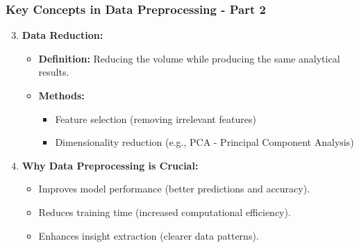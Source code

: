 \documentclass[aspectratio=169]{beamer}
\begin{document}
\begin{frame}[fragile]
    \frametitle{Key Concepts in Data Preprocessing - Part 2}
    \begin{enumerate}
        \setcounter{enumi}{2}
        \item \textbf{Data Reduction:}
        \begin{itemize}
            \item \textbf{Definition:} Reducing the volume while producing the same analytical results.
            \item \textbf{Methods:}
            \begin{itemize}
                \item Feature selection (removing irrelevant features)
                \item Dimensionality reduction (e.g., PCA - Principal Component Analysis)
            \end{itemize}
        \end{itemize}
        
        \item \textbf{Why Data Preprocessing is Crucial:}
        \begin{itemize}
            \item Improves model performance (better predictions and accuracy).
            \item Reduces training time (increased computational efficiency).
            \item Enhances insight extraction (clearer data patterns).
        \end{itemize}
    \end{enumerate}
\end{frame}
\end{document}
